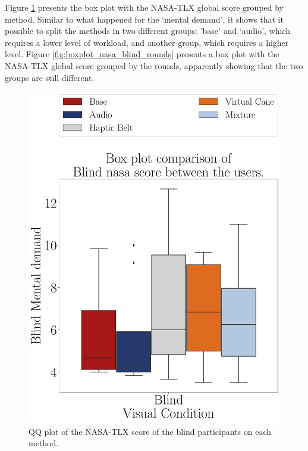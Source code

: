 Figure \ref{fig:boxplot_nasa_blind_scene} presents the box plot with the NASA-TLX global score grouped by method. Similar to what happened for the ‘mental demand’, it shows that it possible to split the methods in two different groups: ’base’ and ‘audio’, which requires a lower level of workload, and another group, which requires a higher level. Figure \ref{fig:boxplot_nasa_blind_rounds} presents a box plot with the NASA-TLX global score grouped by the rounds, apparently showing that the two groups are still different. 

\begin{figure}[!htb]
    \centering
    \begin{minipage}{0.45\textwidth}
        \centering
        \includegraphics[width = 0.8\linewidth]{Resultados/Nasa/Figuras/pdf/boxplot_nasa_blind_scene.pdf}
        \caption{QQ plot of the NASA-TLX score of the blind participants on each method.}
        \label{fig:boxplot_nasa_blind_scene}
    \end{minipage}
    \begin{minipage}{0.075\textwidth}
        \hfill
    \end{minipage}
    \begin{minipage}{0.45\textwidth}
        \centering

\end{minipage}
\end{figure}
